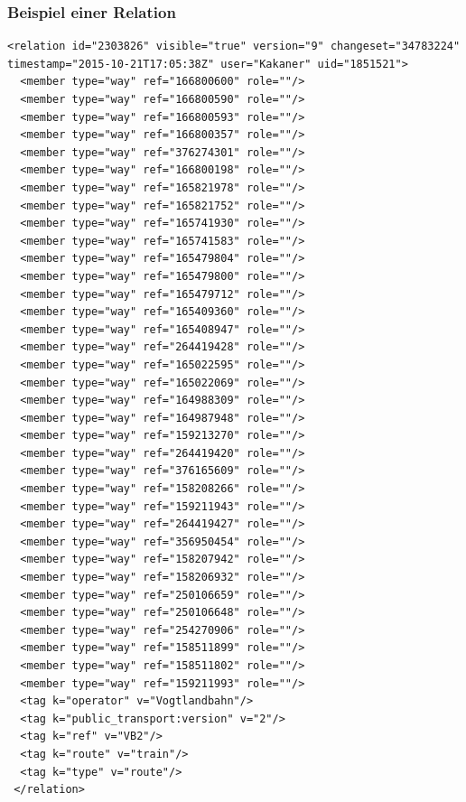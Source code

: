 \subsubsection{Beispiel einer Relation}
\lstset{
  numbers=none,
  caption=Beispiel einer Relation aus planet.osm
}
\begin{lstlisting}
<relation id="2303826" visible="true" version="9" changeset="34783224" timestamp="2015-10-21T17:05:38Z" user="Kakaner" uid="1851521">
  <member type="way" ref="166800600" role=""/>
  <member type="way" ref="166800590" role=""/>
  <member type="way" ref="166800593" role=""/>
  <member type="way" ref="166800357" role=""/>
  <member type="way" ref="376274301" role=""/>
  <member type="way" ref="166800198" role=""/>
  <member type="way" ref="165821978" role=""/>
  <member type="way" ref="165821752" role=""/>
  <member type="way" ref="165741930" role=""/>
  <member type="way" ref="165741583" role=""/>
  <member type="way" ref="165479804" role=""/>
  <member type="way" ref="165479800" role=""/>
  <member type="way" ref="165479712" role=""/>
  <member type="way" ref="165409360" role=""/>
  <member type="way" ref="165408947" role=""/>
  <member type="way" ref="264419428" role=""/>
  <member type="way" ref="165022595" role=""/>
  <member type="way" ref="165022069" role=""/>
  <member type="way" ref="164988309" role=""/>
  <member type="way" ref="164987948" role=""/>
  <member type="way" ref="159213270" role=""/>
  <member type="way" ref="264419420" role=""/>
  <member type="way" ref="376165609" role=""/>
  <member type="way" ref="158208266" role=""/>
  <member type="way" ref="159211943" role=""/>
  <member type="way" ref="264419427" role=""/>
  <member type="way" ref="356950454" role=""/>
  <member type="way" ref="158207942" role=""/>
  <member type="way" ref="158206932" role=""/>
  <member type="way" ref="250106659" role=""/>
  <member type="way" ref="250106648" role=""/>
  <member type="way" ref="254270906" role=""/>
  <member type="way" ref="158511899" role=""/>
  <member type="way" ref="158511802" role=""/>
  <member type="way" ref="159211993" role=""/>
  <tag k="operator" v="Vogtlandbahn"/>
  <tag k="public_transport:version" v="2"/>
  <tag k="ref" v="VB2"/>
  <tag k="route" v="train"/>
  <tag k="type" v="route"/>
 </relation>
\end{lstlisting}

